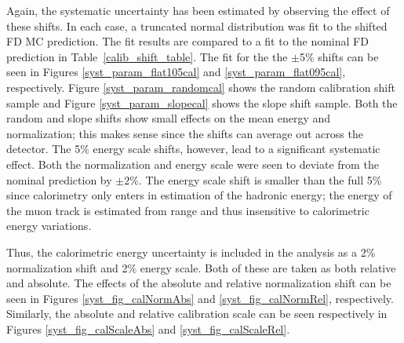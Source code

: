 {Again, the systematic uncertainty has been estimated by observing
the effect of these shifts.
In each case, a truncated normal distribution was fit to the
shifted FD MC prediction.
The fit results are compared to a fit to the nominal FD prediction
in Table~\ref{calib_shift_table}.
The fit for the the $\pm$5\% shifts can be seen in Figures
\ref{syst_param_flat105cal} and \ref{syst_param_flat095cal}, respectively.
Figure \ref{syst_param_randomcal} shows the random calibration
shift sample and Figure \ref{syst_param_slopecal} shows the slope
shift sample.
Both the random and slope shifts show small effects on
the mean energy and normalization;
this makes sense since the shifts can average out across the
detector.
The 5\% energy scale shifts, however, lead to a significant
systematic effect.
Both the normalization and energy scale were seen to deviate from the
nominal prediction by $\pm2$\%.
The energy scale shift is smaller than the full 5\% since calorimetry
only enters in estimation of the hadronic energy;
the energy of the muon track is estimated from range and thus insensitive
to calorimetric energy variations.

Thus, the calorimetric energy uncertainty is included in the analysis
as a 2\% normalization shift and 2\% energy scale.
Both of these are taken as both relative and absolute.
The effects of the absolute and relative normalization shift
can be seen in Figures \ref{syst_fig_calNormAbs} and
\ref{syst_fig_calNormRel}, respectively.
Similarly, the absolute and relative calibration scale
can be seen respectively in Figures \ref{syst_fig_calScaleAbs} and
\ref{syst_fig_calScaleRel}.


}
